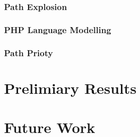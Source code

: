 \subsubsection{Path Explosion}
\subsubsection{PHP Language Modelling}
\subsubsection{Path Prioty}

\section{Prelimiary Results}

\section{Future Work}
